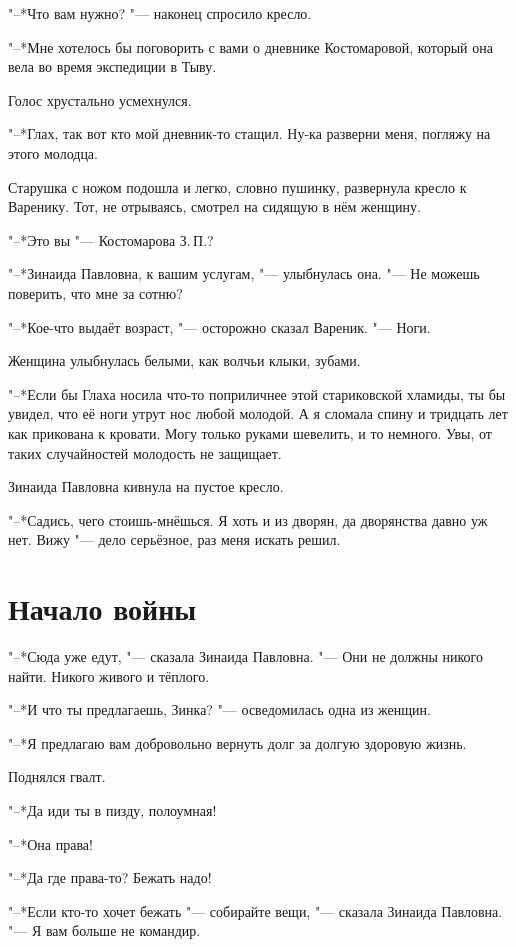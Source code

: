 "--*Что вам нужно? "--- наконец спросило кресло.

"--*Мне хотелось бы поговорить с вами о дневнике Костомаровой, который она вела во время экспедиции в Тыву.

Голос хрустально усмехнулся.

"--*Глах, так вот кто мой дневник-то стащил.
Ну-ка разверни меня, погляжу на этого молодца.

Старушка с ножом подошла и легко, словно пушинку, развернула кресло к Варенику.
Тот, не отрываясь, смотрел на сидящую в нём женщину.

"--*Это вы "--- Костомарова З.\,П.?

"--*Зинаида Павловна, к вашим услугам, "--- улыбнулась она.
"--- Не можешь поверить, что мне за сотню?

"--*Кое-что выдаёт возраст, "--- осторожно сказал Вареник.
"--- Ноги.

Женщина улыбнулась белыми, как волчьи клыки, зубами.

"--*Если бы Глаха носила что-то поприличнее этой стариковской хламиды, ты бы увидел, что её ноги утрут нос любой молодой.
А я сломала спину и тридцать лет как прикована к кровати.
Могу только руками шевелить, и то немного.
Увы, от таких случайностей молодость не защищает.

Зинаида Павловна кивнула на пустое кресло.

"--*Садись, чего стоишь-мнёшься.
Я хоть и из дворян, да дворянства давно уж нет.
Вижу "--- дело серьёзное, раз меня искать решил.

\section{Начало войны}

"--*Сюда уже едут, "--- сказала Зинаида Павловна.
"--- Они не должны никого найти.
Никого живого и тёплого.

"--*И что ты предлагаешь, Зинка? "--- осведомилась одна из женщин.

"--*Я предлагаю вам добровольно вернуть долг за долгую здоровую жизнь.

Поднялся гвалт.

"--*Да иди ты в пизду, полоумная!

"--*Она права!

"--*Да где права-то?
Бежать надо!

"--*Если кто-то хочет бежать "--- собирайте вещи, "--- сказала Зинаида Павловна.
"--- Я вам больше не командир.

